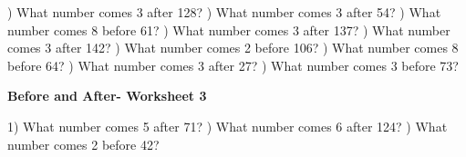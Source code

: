 \documentclass{article}%
\begin{document}
\newline%
) What number comes 3 after 128?%
\newline%
\newline%
) What number comes 3 after 54?%
\newline%
\newline%
) What number comes 8 before 61?%
\newline%
\newline%
) What number comes 3 after 137?%
\newline%
\newline%
) What number comes 3 after 142?%
\newline%
\newline%
) What number comes 2 before 106?%
\newline%
\newline%
) What number comes 8 before 64?%
\newline%
\newline%
) What number comes 3 after 27?%
\newline%
\newline%
) What number comes 3 before 73?%
\newline%
\newline%
\newline%
\pagebreak%
\large%
\begin{center}%
\textbf{Before and After- Worksheet 3}%
\newline%
\newline%
\newline%
\end{center} \normalsize%
1) What number comes 5 after 71?%
\newline%
\newline%
) What number comes 6 after 124?%
\newline%
\newline%
) What number comes 2 before 42?%
\newline%
\newline%
\end{document}
